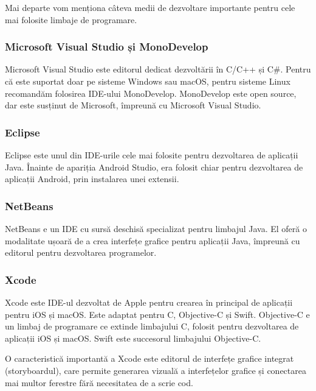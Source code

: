 Mai departe vom menționa câteva medii de dezvoltare importante pentru cele mai
folosite limbaje de programare.

\subsubsection{Microsoft Visual Studio și MonoDevelop}
\label{sec:appdev:dev:ide:mono}

Microsoft Visual Studio este editorul dedicat dezvoltării în C/C++ și C\#.
Pentru că este suportat doar pe sisteme Windows sau macOS, pentru sisteme Linux
recomandăm folosirea IDE-ului MonoDevelop. MonoDevelop este open source, dar
este susținut de Microsoft, împreună cu Microsoft Visual Studio.

\subsubsection{Eclipse}
\label{sec:appdev:dev:ide:eclipse}

Eclipse este unul din IDE-urile cele mai folosite pentru dezvoltarea de
aplicații Java. Înainte de apariția Android Studio, era folosit chiar pentru
dezvoltarea de aplicații Android, prin instalarea unei extensii.

\subsubsection{NetBeans}
\label{sec:appdev:dev:ide:netbeans}

NetBeans e un IDE cu sursă deschisă specializat pentru limbajul Java. El oferă
o modalitate ușoară de a crea interfețe grafice pentru aplicații Java, împreună
cu editorul pentru dezvoltarea programelor.

\subsubsection{Xcode}
\label{sec:appdev:dev:ide:xcode}

Xcode este IDE-ul dezvoltat de Apple pentru crearea în principal de aplicații
pentru iOS și macOS. Este adaptat pentru C, Objective-C și Swift. Objective-C e
un limbaj de programare ce extinde limbajului C, folosit pentru dezvoltarea de
aplicații iOS și macOS. Swift este succesorul limbajului Objective-C.

O caracteristică importantă a Xcode este editorul de interfețe grafice integrat
(storyboardul), care permite generarea vizuală a interfețelor grafice și
conectarea mai multor ferestre fără necesitatea de a scrie cod.

